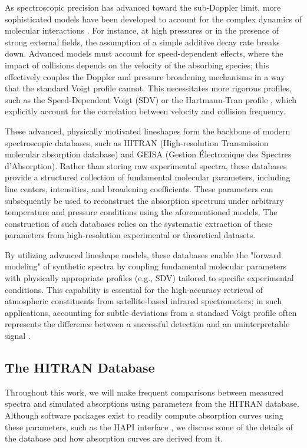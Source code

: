 \documentclass[12pt]{report}
\begin{document}
	As spectroscopic precision has advanced toward the sub-Doppler limit, more sophisticated models have been developed to account for the complex dynamics of molecular interactions \cite{book_collisionalEffects_hartmann}. For instance, at high pressures or in the presence of strong external fields, the assumption of a simple additive decay rate breaks down. Advanced models must account for speed-dependent effects, where the impact of collisions depends on the velocity of the absorbing species; this effectively couples the Doppler and pressure broadening mechanisms in a way that the standard Voigt profile cannot. This necessitates more rigorous profiles, such as the Speed-Dependent Voigt (SDV) or the Hartmann-Tran profile \cite{hartmann_tran_IUPAC}, which explicitly account for the correlation between velocity and collision frequency.
	
	These advanced, physically motivated lineshapes form the backbone of modern spectroscopic databases, such as HITRAN (High-resolution Transmission molecular absorption database) and GEISA (Gestion Électronique des Spectres d'Absorption). Rather than storing raw experimental spectra, these databases provide a structured collection of fundamental molecular parameters, including line centers, intensities, and broadening coefficients. These parameters can subsequently be used to reconstruct the absorption spectrum under arbitrary temperature and pressure conditions using the aforementioned models. The construction of such databases relies on the systematic extraction of these parameters from high-resolution experimental or theoretical datasets.
	
	By utilizing advanced lineshape models, these databases enable the "forward modeling" of synthetic spectra by coupling fundamental molecular parameters with physically appropriate profiles (e.g., SDV) tailored to specific experimental conditions. This capability is essential for the high-accuracy retrieval of atmospheric constituents from satellite-based infrared spectrometers; in such applications, accounting for subtle deviations from a standard Voigt profile often represents the difference between a successful detection and an uninterpretable signal \cite{hitran_cia_2019}.
	
	\subsection{The HITRAN Database}
	
	Throughout this work, we will make frequent comparisons between measured spectra and simulated absorptions using parameters from the HITRAN database. Although software packages exist to readily compute absorption curves using these parameters, such as the HAPI interface \cite{HAPI_2016}, we discuss some of the details of the database and how absorption curves are derived from it.
	
\end{document}
